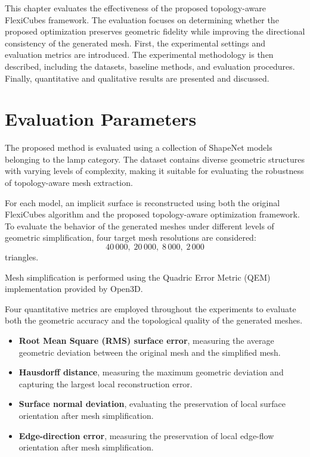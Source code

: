 \documentclass[../main.tex]{subfiles}
\begin{document}
	
This chapter evaluates the effectiveness of the proposed topology-aware FlexiCubes framework. The evaluation focuses on determining whether the proposed optimization preserves geometric fidelity while improving the directional consistency of the generated mesh. First, the experimental settings and evaluation metrics are introduced. The experimental methodology is then described, including the datasets, baseline methods, and evaluation procedures. Finally, quantitative and qualitative results are presented and discussed.

\section{Evaluation Parameters}

The proposed method is evaluated using a collection of ShapeNet models belonging to the lamp category. The dataset contains diverse geometric structures with varying levels of complexity, making it suitable for evaluating the robustness of topology-aware mesh extraction.

For each model, an implicit surface is reconstructed using both the original FlexiCubes algorithm and the proposed topology-aware optimization framework. To evaluate the behavior of the generated meshes under different levels of geometric simplification, four target mesh resolutions are considered:
\[
40\,000,\;
20\,000,\;
8\,000,\;
2\,000
\]
triangles.

Mesh simplification is performed using the Quadric Error Metric (QEM) implementation provided by Open3D.

Four quantitative metrics are employed throughout the experiments to evaluate both the geometric accuracy and the topological quality of the generated meshes.

\begin{itemize}
	\item \textbf{Root Mean Square (RMS) surface error}, measuring the average geometric deviation between the original mesh and the simplified mesh.
	
	\item \textbf{Hausdorff distance}, measuring the maximum geometric deviation and capturing the largest local reconstruction error.
	
	\item \textbf{Surface normal deviation}, evaluating the preservation of local surface orientation after mesh simplification.
	
	\item \textbf{Edge-direction error}, measuring the preservation of local edge-flow orientation after mesh simplification.
\end{itemize}
\end{document}
